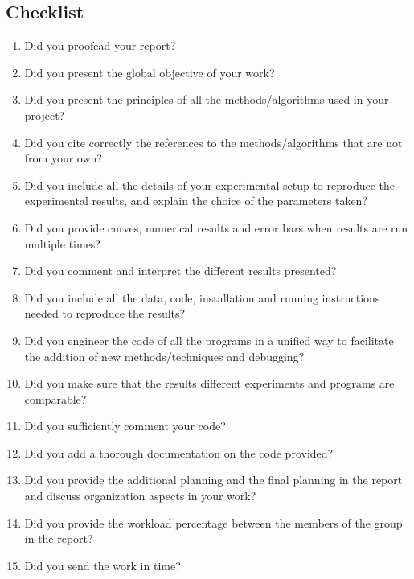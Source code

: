 \documentclass[a4paper, 11pt]{article}
\begin{document}
\subsection{Checklist}
\begin{enumerate}
    \item Did you proofead your report?
    \item Did you present the global objective of your work?
    \item Did you present the principles of all the methods/algorithms used in your project?
    \item Did you cite correctly the references to the methods/algorithms that are not from your own?
    \item Did you include all the details of your experimental setup to reproduce the experimental results, and explain the choice of the parameters taken?
    \item Did you provide curves, numerical results and error bars when results are run multiple times?
    \item Did you comment and interpret the different results presented?
    \item Did you include all the data, code, installation and running instructions needed to reproduce the results?
    \item Did you engineer the code of all the programs in a unified way to facilitate the addition of new methods/techniques and debugging?
    \item Did you make sure that the results different experiments and programs are comparable?
    \item Did you sufficiently comment your code?
    \item Did you add a thorough documentation on the code provided?
    \item Did you provide the additional planning and the final planning in the report and discuss organization aspects in your work?
    \item Did you provide the workload percentage between the members of the group in the report?
    \item Did you send the work in time?
\end{enumerate}
\end{document}
